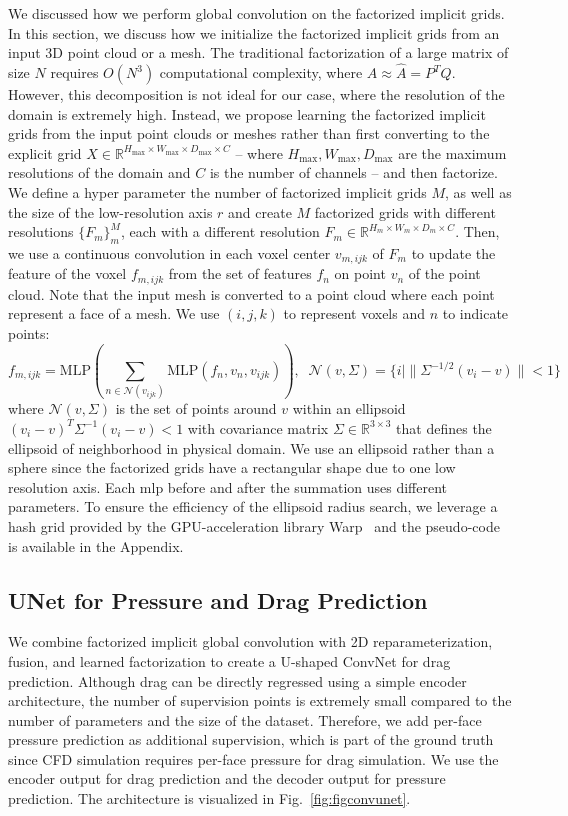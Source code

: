 We discussed how we perform global convolution on the factorized implicit grids. In this section, we discuss how we initialize the factorized implicit grids from an input 3D point cloud or a mesh.
The traditional factorization of a large matrix of size $N$ requires $O(N^3)$ computational complexity, where $A \approx \hat{A} = P^TQ$. However, this decomposition is not ideal for our case, where the resolution of the domain is extremely high.
Instead, we propose learning the factorized implicit grids from the input point clouds or meshes rather than first converting to the explicit grid $X \in \mathbb{R}^{H_{\max} \times W_{\max} \times D_{\max} \times C}$ -- where $H_{\max}, W_{\max}, D_{\max}$ are the maximum resolutions of the domain and $C$ is the number of channels -- and then factorize.
We define a hyper parameter the number of factorized implicit grids $M$, as well as the size of the low-resolution axis $r$ and create $M$ factorized grids with different resolutions $\{F_m\}_m^M$, each with a different resolution $F_m \in \mathbb{R}^{H_m \times W_m \times D_m \times C}$.
Then, we use a continuous convolution in each voxel center $v_{m,ijk}$ of $F_m$ to update the feature of the voxel $f_{m,ijk}$ from the set of features $f_n$ on point $v_n$ of the point cloud. Note that the input mesh is converted to a point cloud where each point represent a face of a mesh. We use $(i,j,k)$ to represent voxels and $n$ to indicate points:
\begin{equation}
    f_{m,ijk} = \text{MLP} \left( \sum_{n \in \mathcal{N}(v_{ijk})} \text{MLP}(f_n, v_n, v_{ijk}) \right), \;\;\mathcal{N}(v, \Sigma) = \{i | \|\Sigma^{-1/2}(v_i - v)\| < 1 \}
    \label{eq:point_conv}
\end{equation}
where $\mathcal{N}(v, \Sigma)$ is the set of points around $v$ within an ellipsoid $(v_i-v)^T\Sigma^{-1}(v_i - v) < 1$ with covariance matrix $\Sigma \in \mathbb{R}^{3\times 3}$ that defines the ellipsoid of neighborhood in physical domain. We use an ellipsoid rather than a sphere since the factorized grids have a rectangular shape due to one low resolution axis. Each mlp before and after the summation uses different parameters.
To ensure the efficiency of the ellipsoid radius search, we leverage a hash grid provided by the GPU-acceleration library Warp~\citep{warp2022} and the pseudo-code is available in the Appendix.


\subsection{UNet for Pressure and Drag Prediction}
\label{sec:unet_for_drag}

We combine factorized implicit global convolution with 2D reparameterization, fusion, and learned factorization to create a U-shaped ConvNet for drag prediction.
Although drag can be directly regressed using a simple encoder architecture, the number of supervision points is extremely small compared to the number of parameters and the size of the dataset. Therefore, we add per-face pressure prediction as additional supervision, which is part of the ground truth since CFD simulation requires per-face pressure for drag simulation.
We use the encoder output for drag prediction and the decoder output for pressure prediction. The architecture is visualized in Fig.~\ref{fig:figconvunet}.
